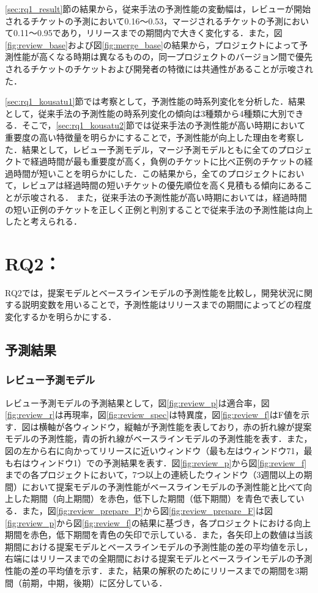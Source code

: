 \documentclass[submit]{ipsj}
\begin{document}
\ref{sec:rq1_result}節の結果から，従来手法の予測性能の変動幅は，レビューが開始されるチケットの予測において0.16〜0.53，マージされるチケットの予測において0.11〜0.95であり，リリースまでの期間内で大きく変化する．また，図\ref{fig:review_base}および図\ref{fig:merge_base}の結果から，プロジェクトによって予測性能が高くなる時期は異なるものの，同一プロジェクトのバージョン間で優先されるチケットのチケットおよび開発者の特徴には共通性があることが示唆された．

\ref{sec:rq1_kousatu1}節では考察として，予測性能の時系列変化を分析した．結果として，従来手法の予測性能の時系列変化の傾向は3種類から4種類に大別できる．そこで，\ref{sec:rq1_kousatu2}節では従来手法の予測性能が高い時期において重要度の高い特徴量を明らかにすることで，予測性能が向上した理由を考察した．結果として，レビュー予測モデル，マージ予測モデルともに全てのプロジェクトで経過時間が最も重要度が高く，負例のチケットに比べ正例のチケットの経過時間が短いことを明らかにした．この結果から，全てのプロジェクトにおいて，レビュアは経過時間の短いチケットの優先順位を高く見積もる傾向にあることが示唆される．
また，従来手法の予測性能が高い時期においては，経過時間の短い正例のチケットを正しく正例と判別することで従来手法の予測性能は向上したと考えられる．


\chapter{RQ2：\rqtwo}\label{sec:rq2}
RQ2では，提案モデルとベースラインモデルの予測性能を比較し，開発状況に関する説明変数を用いることで，予測性能はリリースまでの期間によってどの程度変化するかを明らかにする．

\section{予測結果}\label{sec:rq2_result}
\subsection{レビュー予測モデル}\label{sec:rq2_review}
レビュー予測モデルの予測結果として，図\ref{fig:review_p}は適合率，図\ref{fig:review_r}は再現率，図\ref{fig:review_spec}は特異度，図\ref{fig:review_f}はF値を示す．図は横軸が各ウィンドウ，縦軸が予測性能を表しており，赤の折れ線が提案モデルの予測性能，青の折れ線がベースラインモデルの予測性能を表す．また，図の左から右に向かってリリースに近いウィンドウ（最も左はウィンドウ71，最も右はウィンドウ1）での予測結果を表す．図\ref{fig:review_p}から図\ref{fig:review_f}までの各プロジェクトにおいて，7つ以上の連続したウィンドウ（3週間以上の期間）において提案モデルの予測性能がベースラインモデルの予測性能と比べて向上した期間（向上期間）を赤色，低下した期間（低下期間）を青色で表している．また，図\ref{fig:review_prepare_P}から図\ref{fig:review_prepare_F}は図\ref{fig:review_p}から図\ref{fig:review_f}の結果に基づき，各プロジェクトにおける向上期間を赤色，低下期間を青色の矢印で示している．また，各矢印上の数値は当該期間における提案モデルとベースラインモデルの予測性能の差の平均値を示し，右端にはリリースまでの全期間における提案モデルとベースラインモデルの予測性能の差の平均値を示す．また，結果の解釈のためにリリースまでの期間を3期間（前期，中期，後期）に区分している．
\end{document}
